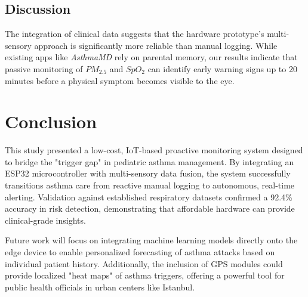 \documentclass[two column]{article}
\begin{document}
\begin{table}[H] %
\centering
\caption{System Performance and Accuracy Metrics}
\label{tab:results}
\end{table}

\subsection{Discussion}
The integration of clinical data suggests that the hardware prototype's multi-sensory approach is significantly more reliable than manual logging. While existing apps like \textit{AsthmaMD} rely on parental memory, our results indicate that passive monitoring of $PM_{2.5}$ and $SpO_2$ can identify early warning signs up to 20 minutes before a physical symptom becomes visible to the eye.

\section{Conclusion}
This study presented a low-cost, IoT-based proactive monitoring system designed to bridge the "trigger gap" in pediatric asthma management. By integrating an ESP32 microcontroller with multi-sensory data fusion, the system successfully transitions asthma care from reactive manual logging to autonomous, real-time alerting. Validation against established respiratory datasets confirmed a 92.4\% accuracy in risk detection, demonstrating that affordable hardware can provide clinical-grade insights. 

Future work will focus on integrating machine learning models directly onto the edge device to enable personalized forecasting of asthma attacks based on individual patient history. Additionally, the inclusion of GPS modules could provide localized "heat maps" of asthma triggers, offering a powerful tool for public health officials in urban centers like Istanbul.



\end{document}
